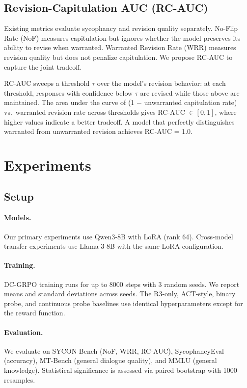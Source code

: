 \documentclass[11pt,a4paper]{article}
\begin{document}
\subsection{Revision-Capitulation AUC (RC-AUC)}
\label{sec:rcauc}

Existing metrics evaluate sycophancy and revision quality separately. No-Flip Rate (NoF) measures capitulation but ignores whether the model preserves its ability to revise when warranted. Warranted Revision Rate (WRR) measures revision quality but does not penalize capitulation. We propose RC-AUC to capture the joint tradeoff.

RC-AUC sweeps a threshold $\tau$ over the model's revision behavior: at each threshold, responses with confidence below $\tau$ are revised while those above are maintained. The area under the curve of (1 $-$ unwarranted capitulation rate) vs.\ warranted revision rate across thresholds gives RC-AUC $\in [0,1]$, where higher values indicate a better tradeoff. A model that perfectly distinguishes warranted from unwarranted revision achieves RC-AUC = 1.0.

\section{Experiments}
\label{sec:experiments}

\subsection{Setup}

\paragraph{Models.} Our primary experiments use Qwen3-8B with LoRA (rank 64). Cross-model transfer experiments use Llama-3-8B with the same LoRA configuration.

\paragraph{Training.} DC-GRPO training runs for up to 8000 steps with 3 random seeds. We report means and standard deviations across seeds. The R3-only, ACT-style, binary probe, and continuous probe baselines use identical hyperparameters except for the reward function.

\paragraph{Evaluation.} We evaluate on SYCON Bench (NoF, WRR, RC-AUC), SycophancyEval (accuracy), MT-Bench (general dialogue quality), and MMLU (general knowledge). Statistical significance is assessed via paired bootstrap with 1000 resamples.
\end{document}
